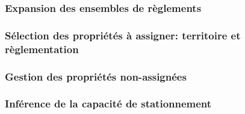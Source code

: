         \subsubsection{Expansion des ensembles de règlements}
        \subsubsection{Sélection des propriétés à assigner: territoire et règlementation}
        \subsubsection{Gestion des propriétés non-assignées}
        \subsubsection{Inférence de la capacité de stationnement} 